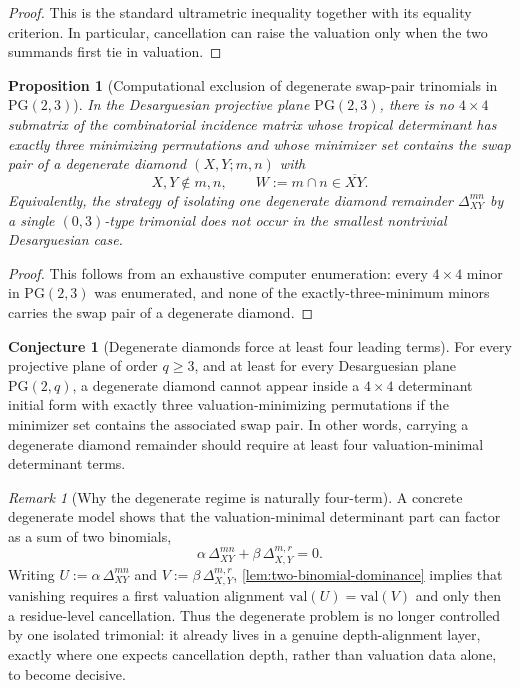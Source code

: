 \documentclass[11pt]{amsart}
\numberwithin{equation}{section}
\theoremstyle{plain}
\newtheorem{proposition}[theorem]{Proposition}
\theoremstyle{definition}
\newtheorem{conjecture}[theorem]{Conjecture}
\theoremstyle{remark}
\newtheorem{remark}[theorem]{Remark}
\newcommand{\val}{\mathrm{val}}
\begin{document}
\begin{proof}
This is the standard ultrametric inequality together with its equality criterion. In particular, cancellation can raise the valuation only when the two summands first tie in valuation.
\end{proof}

\begin{proposition}[Computational exclusion of degenerate swap-pair trinomials in $\mathrm{PG}(2,3)$]
\label{prop:pg23-degenerate-no-trinomial}
In the Desarguesian projective plane $\mathrm{PG}(2,3)$, there is no $4\times4$ submatrix of the combinatorial incidence matrix whose tropical determinant has exactly three minimizing permutations and whose minimizer set contains the swap pair of a degenerate diamond $(X,Y;m,n)$ with
\[
X,Y\notin m,n,
\qquad
W:=m\cap n\in \overline{XY}.
\]
Equivalently, the strategy of isolating one degenerate diamond remainder $\Delta_{XY}^{mn}$ by a single $(0,3)$-type trimonial does not occur in the smallest nontrivial Desarguesian case.
\end{proposition}

\begin{proof}
This follows from an exhaustive computer enumeration: every $4\times4$ minor in $\mathrm{PG}(2,3)$ was enumerated, and none of the exactly-three-minimum minors carries the swap pair of a degenerate diamond.
\end{proof}

\begin{conjecture}[Degenerate diamonds force at least four leading terms]
\label{conj:degenerate-no-trinomial}
For every projective plane of order $q\ge 3$, and at least for every Desarguesian plane $\mathrm{PG}(2,q)$, a degenerate diamond cannot appear inside a $4\times4$ determinant initial form with exactly three valuation-minimizing permutations if the minimizer set contains the associated swap pair. In other words, carrying a degenerate diamond remainder should require at least four valuation-minimal determinant terms.
\end{conjecture}

\begin{remark}[Why the degenerate regime is naturally four-term]
A concrete degenerate model shows that the valuation-minimal determinant part can factor as a sum of two binomials,
\[
\alpha\,\Delta_{XY}^{mn}+\beta\,\Delta_{X,Y}^{m,r}=0.
\]
Writing $U:=\alpha\,\Delta_{XY}^{mn}$ and $V:=\beta\,\Delta_{X,Y}^{m,r}$, \cref{lem:two-binomial-dominance} implies that vanishing requires a first valuation alignment $\val(U)=\val(V)$ and only then a residue-level cancellation. Thus the degenerate problem is no longer controlled by one isolated trimonial: it already lives in a genuine depth-alignment layer, exactly where one expects cancellation depth, rather than valuation data alone, to become decisive.
\end{remark}
\end{document}
